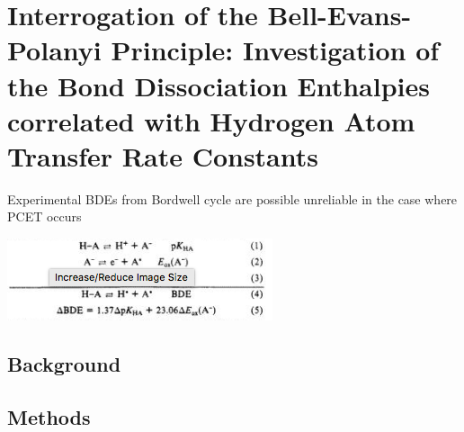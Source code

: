 
\chapter{Interrogation of the Bell-Evans-Polanyi Principle: Investigation of the
Bond Dissociation Enthalpies correlated with Hydrogen Atom Transfer Rate Constants}
\label{ch:bde}

Experimental BDEs from Bordwell\cite{Bordwell1988} cycle are possible unreliable
in the case where PCET occurs \cite{Miller2016}

\includegraphics{figures/bordwell}

\section{Background}

\section{Methods}
